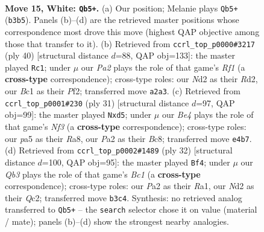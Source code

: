 \documentclass[11pt]{article}
\begin{document}
\clearpage

\begin{figure}[p]\centering
\begin{subfigure}{0.46\textwidth}\centering
\resizebox{\linewidth}{!}{%
\newchessgame
\chessboard[
  setfen={rnbqk2r/1p4b1/4p3/p5pp/3PB3/1Q6/P2N1PPP/R1B2RK1 w kq - 0 15},
  showmover=false,
  pgfstyle=straightmove, color=movearrow, markmove={b3-b5}
]}
\caption{}
\end{subfigure}\hfill
\begin{subfigure}{0.46\textwidth}\centering
\resizebox{\linewidth}{!}{%
\newchessgame
\chessboard[
  setfen={1nrrq1k1/p4pp1/7p/1ppP4/b7/4PN2/PQ1RBPPP/5RK1 w - - 0 21},
  showmover=false,
  pgfstyle=straightmove, color=movearrow, markmove={f1-c1}
]}
\caption{}
\end{subfigure}
\\[4pt]
\begin{subfigure}{0.46\textwidth}\centering
\resizebox{\linewidth}{!}{%
\newchessgame
\chessboard[
  setfen={r1bq1rk1/pp3ppp/5n2/1N1Pb3/8/3Q4/PP2BPPP/R1B2RK1 b - - 0 16},
  showmover=false,
  pgfstyle=straightmove, color=movearrow, markmove={f6-d5}
]}
\caption{}
\end{subfigure}\hfill
\begin{subfigure}{0.46\textwidth}\centering
\resizebox{\linewidth}{!}{%
\newchessgame
\chessboard[
  setfen={r1b2r1k/ppq1bpp1/7p/4n3/2P1B3/P7/2Q1NPPP/R1B2RK1 w - - 0 17},
  showmover=false,
  pgfstyle=straightmove, color=movearrow, markmove={c1-f4}
]}
\caption{}
\end{subfigure}
\caption{\textbf{Move 15, White: \texttt{Qb5+}.} (a) Our position; Melanie plays \texttt{Qb5+} (\texttt{b3b5}). Panels (b)--(d) are the retrieved master positions whose correspondence most drove this move (highest QAP objective among those that transfer to it). (b) Retrieved from \texttt{ccrl\_top\_p0000\#3217} (ply 40) [structural distance $d$=88, QAP obj=133]: the master played \texttt{Rc1}; under $\mu$ our \emph{Pa2} plays the role of that game's \emph{Rf1} (a \textbf{cross-type} correspondence); cross-type roles: our \emph{N}d2 as their \emph{R}d2, our \emph{B}c1 as their \emph{P}f2; transferred move \texttt{a2a3}. (c) Retrieved from \texttt{ccrl\_top\_p0001\#230} (ply 31) [structural distance $d$=97, QAP obj=99]: the master played \texttt{Nxd5}; under $\mu$ our \emph{Be4} plays the role of that game's \emph{Nf3} (a \textbf{cross-type} correspondence); cross-type roles: our \emph{p}a5 as their \emph{R}a8, our \emph{P}a2 as their \emph{B}c8; transferred move \texttt{e4b7}. (d) Retrieved from \texttt{ccrl\_top\_p0002\#1489} (ply 32) [structural distance $d$=100, QAP obj=95]: the master played \texttt{Bf4}; under $\mu$ our \emph{Qb3} plays the role of that game's \emph{Bc1} (a \textbf{cross-type} correspondence); cross-type roles: our \emph{P}a2 as their \emph{R}a1, our \emph{N}d2 as their \emph{Q}c2; transferred move \texttt{b3c4}. Synthesis: no retrieved analog transferred to \texttt{Qb5+} -- the \texttt{search} selector chose it on value (material / mate); panels (b)--(d) show the strongest nearby analogies.}
\label{fig:thought-m28}
\end{figure}
\end{document}
